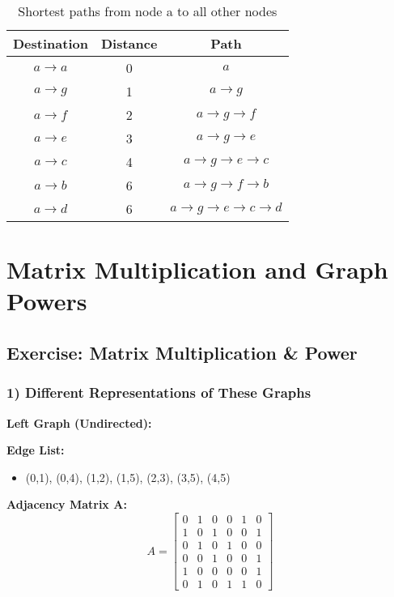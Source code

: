 \documentclass[12pt,a4paper]{article}
\begin{document}
\begin{table}[h]
\centering
\begin{tabular}{ccc}
\toprule
Destination & Distance & Path \\
\midrule
$a \rightarrow a$ & 0 & $a$ \\
$a \rightarrow g$ & 1 & $a \rightarrow g$ \\
$a \rightarrow f$ & 2 & $a \rightarrow g \rightarrow f$ \\
$a \rightarrow e$ & 3 & $a \rightarrow g \rightarrow e$ \\
$a \rightarrow c$ & 4 & $a \rightarrow g \rightarrow e \rightarrow c$ \\
$a \rightarrow b$ & 6 & $a \rightarrow g \rightarrow f \rightarrow b$ \\
$a \rightarrow d$ & 6 & $a \rightarrow g \rightarrow e \rightarrow c \rightarrow d$ \\
\bottomrule
\end{tabular}
\caption{Shortest paths from node a to all other nodes}
\end{table}

\section{Matrix Multiplication and Graph Powers}

\subsection{Exercise: Matrix Multiplication \& Power}

\subsubsection{1) Different Representations of These Graphs}

\textbf{Left Graph (Undirected):}

\textbf{Edge List:}
\begin{itemize}
    \item (0,1), (0,4), (1,2), (1,5), (2,3), (3,5), (4,5)
\end{itemize}

\textbf{Adjacency Matrix A:}
\begin{equation}
A = \begin{bmatrix}
0 & 1 & 0 & 0 & 1 & 0 \\
1 & 0 & 1 & 0 & 0 & 1 \\
0 & 1 & 0 & 1 & 0 & 0 \\
0 & 0 & 1 & 0 & 0 & 1 \\
1 & 0 & 0 & 0 & 0 & 1 \\
0 & 1 & 0 & 1 & 1 & 0
\end{bmatrix}
\end{equation}
\end{document}

